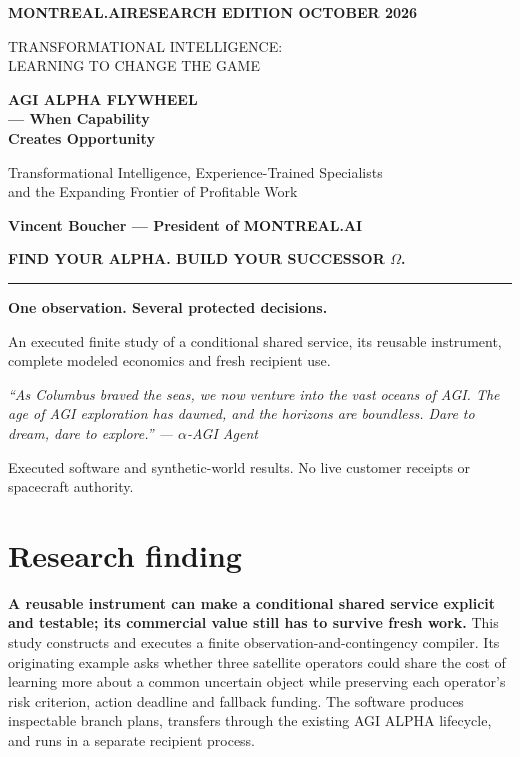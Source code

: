 \documentclass[11pt,letterpaper]{article}
\begin{document}
\begin{titlepage}
\color{navy}
{\sffamily\small\bfseries MONTREAL.AI\hfill RESEARCH EDITION OCTOBER 2026\par}
\vspace{1.4cm}
{\sffamily\small\color{teal} TRANSFORMATIONAL INTELLIGENCE:\\ LEARNING TO CHANGE THE GAME\par}
\vspace{0.8cm}
{\sffamily\fontsize{28}{33}\selectfont\bfseries AGI ALPHA FLYWHEEL\\[0.35cm]
\fontsize{24}{29}\selectfont — When Capability\\ Creates Opportunity\par}
\vspace{0.65cm}
{\sffamily\large Transformational Intelligence, Experience-Trained Specialists\\
and the Expanding Frontier of Profitable Work\par}
\vspace{0.8cm}
{\large\bfseries Vincent Boucher --- President of MONTREAL.AI\par}
\vspace{0.9cm}
{\sffamily\color{teal}\bfseries FIND YOUR ALPHA. BUILD YOUR SUCCESSOR \(\Omega\).\par}
\vfill
\rule{\textwidth}{0.5pt}
{\sffamily\large\bfseries One observation. Several protected decisions.\par}
{\normalsize An executed finite study of a conditional shared service, its reusable instrument,
complete modeled economics and fresh recipient use.\par}
\vspace{0.5cm}
{\small\itshape ``As Columbus braved the seas, we now venture into the vast oceans of AGI.
The age of AGI exploration has dawned, and the horizons are boundless.
Dare to dream, dare to explore.'' --- \(\alpha\)-AGI Agent\par}
\vspace{0.5cm}
{\sffamily\footnotesize Executed software and synthetic-world results. No live customer receipts or spacecraft authority.}
\end{titlepage}
\hypertarget{research-finding}{%
\section{Research finding}\label{research-finding}}

\textbf{A reusable instrument can make a conditional shared service
explicit and testable; its commercial value still has to survive fresh
work.} This study constructs and executes a finite
observation-and-contingency compiler. Its originating example asks
whether three satellite operators could share the cost of learning more
about a common uncertain object while preserving each operator's risk
criterion, action deadline and fallback funding. The software produces
inspectable branch plans, transfers through the existing AGI ALPHA
lifecycle, and runs in a separate recipient process.
\end{document}
